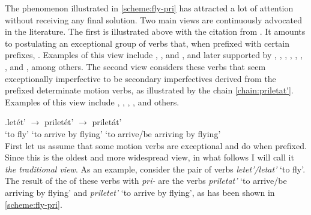 The phenomenon illustrated in \ref{scheme:fly-pri} has attracted a lot of attention without receiving any final solution. Two main views are continuously advocated in the literature. The first is illustrated above with the citation from \citet{Titelbaum:90}. It amounts to postulating an exceptional group of verbs that, when prefixed with certain prefixes, . Examples of this view include \citet[46]{Meillet:1902}, \citet[5]{Mazon:1908}, and \citet{Vondrak:1908}, and later supported by \citet{Shaxmatov:41}, \citet{Gvozdev:73}, \citet{Vinogradov:72}, \citet{Townsend:75}, \citet{Shvedova:82}, \citet{Wade:92}, \citet{Nesset:08}, and \citet{Janda:10}, among others. The second view considers these verbs that seem exceptionally imperfective to be secondary imperfectives derived from the prefixed determinate motion verbs, as illustrated by the chain \ref{chain:priletat'}. Examples of this view include \citet{Regnell:44}, \citet[337-344]{Isachenko:60}, \citet[87-95]{ZaliznjakShmelev:00}, \citet{Romanova:06}, and others.

\exg.\label{chain:priletat'}{let\'{e}t'\textsuperscript{\IPF}} {$\to$} {prilet\'{e}t'\textsuperscript{\PF}} {$\to$} prilet\'{a}t'\textsuperscript{\IPF}\\
{`to fly'} {} {`to arrive by flying'} {} {`to arrive/be arriving by flying'}\\


First let us assume that some motion verbs are exceptional and do  when prefixed. Since this is the oldest and more widespread view, in what follows I will call it \textit{the traditional view}. As an example, consider the pair of verbs \textit{letet'/letat'} `to fly'. The result of the  of these verbs with \textit{pri-} are the verbs \textit{priletat'}\textsuperscript{\IPF} `to arrive/be arriving by flying' and \textit{priletet'\textsuperscript{\PF}} `to arrive by flying', as has been shown in \ref{scheme:fly-pri}. 


